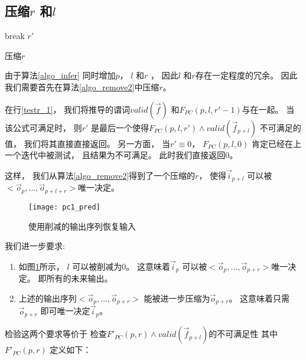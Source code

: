 \subsection{压缩$r$ 和$l$}\label{reduceing}

\begin{algorithm}[t]
\begin{algorithmic}[1]
\label{testr_1}
    \STATE break
  \ENDIF
\ENDFOR
\RETURN $r'$
\caption{压缩$r$}
\label{algo_remove2}
\end{algorithmic}
\end{algorithm}

由于算法\ref{algo_infer} 同时增加$p$， $l$ 和$r$ ，
因此$l$ 和$r$存在一定程度的冗余。
因此我们需要首先在算法\ref{algo_remove2}中压缩$r$。


在行\ref{testr_1}，
我们将推导的谓词$valid(\vec{f})$ 和$F_{PC}(p,l,r'-1)$与在一起。
当该公式可满足时，
则$r'$ 是最后一个使得$F_{PC}(p,l,r')\wedge valid(\vec{f}_{p+l})$ 不可满足的值，
我们将其直接直接返回。
另一方面，
当$r'\equiv 0$，
$F_{PC}(p,l,0)$ 肯定已经在上一个迭代中被测试，
且结果为不可满足。
此时我们直接返回$0$。


这样，
我们从算法\ref{algo_remove2}得到了一个压缩的$r$，
使得$\vec{i}_{p+l}$ 可以被$<\vec{o}_{p},\dots,\vec{o}_{p+l+r}>$唯一决定。

\begin{figure}[b]
\begin{center}
\texttt{[image: pc1\_pred]}
\end{center}
\caption{使用削减的输出序列恢复输入}
  \label{fig_pc1}
\end{figure}

我们进一步要求:
\begin{enumerate}
 \item 如图\ref{fig_pc1}所示，
 $l$ 可以被削减为0。
 这意味着$\vec{i}_{p}$ 可以被$<\vec{o}_{p},\dots,\vec{o}_{p+r}>$唯一决定。
 即所有的未来输出。
 \item 上述的输出序列$<\vec{o}_{p},\dots,\vec{o}_{p+r}>$
 能被进一步压缩为$\vec{o}_{p+r}$。
 这意味着只需$\vec{o}_{p+r}$ 即可唯一决定$\vec{i}_p$。
\end{enumerate}

检验这两个要求等价于
检查$F'_{PC}(p,r)\wedge valid(\vec{f}_{p+l})$的不可满足性
其中$F'_{PC}(p,r)$ 定义如下：

